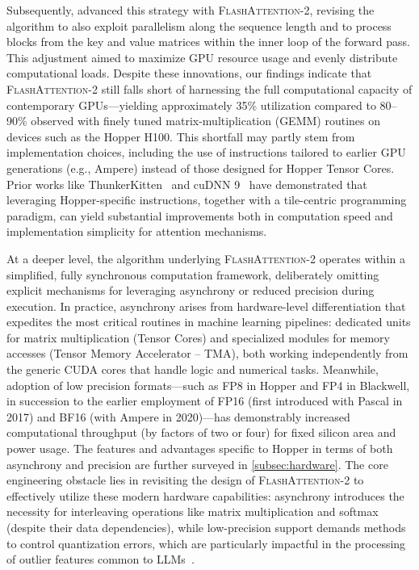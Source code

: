 Subsequently, \citet{dao2023flashattention2} advanced this strategy with \textsc{FlashAttention-2}, revising the algorithm to also exploit parallelism along the sequence length and to process blocks from the key and value matrices within the inner loop of the forward pass. This adjustment aimed to maximize GPU resource usage and evenly distribute computational loads. Despite these innovations, our findings indicate that \textsc{FlashAttention-2} still falls short of harnessing the full computational capacity of contemporary GPUs—yielding approximately 35\% utilization compared to 80–90\% observed with finely tuned matrix-multiplication (GEMM) routines on devices such as the Hopper H100. This shortfall may partly stem from implementation choices, including the use of instructions tailored to earlier GPU generations (e.g., Ampere) instead of those designed for Hopper Tensor Cores. Prior works like ThunkerKitten~\citep{spector2024thunder} and cuDNN 9~\citep{cudnn9} have demonstrated that leveraging Hopper-specific instructions, together with a tile-centric programming paradigm, can yield substantial improvements both in computation speed and implementation simplicity for attention mechanisms.

At a deeper level, the algorithm underlying \textsc{FlashAttention-2} operates within a simplified, fully synchronous computation framework, deliberately omitting explicit mechanisms for leveraging asynchrony or reduced precision during execution. In practice, asynchrony arises from hardware-level differentiation that expedites the most critical routines in machine learning pipelines: dedicated units for matrix multiplication (Tensor Cores) and specialized modules for memory accesses (Tensor Memory Accelerator -- TMA), both working independently from the generic CUDA cores that handle logic and numerical tasks. Meanwhile, adoption of low precision formats—such as FP8 in Hopper and FP4 in Blackwell, in succession to the earlier employment of FP16 (first introduced with Pascal in 2017) and BF16 (with Ampere in 2020)—has demonstrably increased computational throughput (by factors of two or four) for fixed silicon area and power usage. The features and advantages specific to Hopper in terms of both asynchrony and precision are further surveyed in \cref{subsec:hardware}. 
The core engineering obstacle lies in revisiting the design of \textsc{FlashAttention-2} to effectively utilize these modern hardware capabilities: asynchrony introduces the necessity for interleaving operations like matrix multiplication and softmax (despite their data dependencies), while low-precision support demands methods to control quantization errors, which are particularly impactful in the processing of outlier features common to LLMs~\citep{dettmers2208llm, sun2024massive}.


